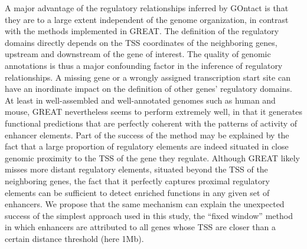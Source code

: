 A major advantage of the regulatory relationships inferred by GOntact is that they are to a large extent independent of the genome organization, in contrast with the methods implemented in GREAT. The definition of the regulatory domains directly depends on the TSS coordinates of the neighboring genes, upstream and downstream of the gene of interest. The quality of genomic annotations is thus a major confounding factor in the inference of regulatory relationships. A missing gene or a wrongly assigned transcription start site can have an inordinate impact on the definition of other genes’ regulatory domains. At least in well-assembled and well-annotated genomes such as human and mouse, GREAT nevertheless seems to perform extremely well, in that it generates functional predictions that are perfectly coherent with the patterns of activity of enhancer elements. Part of the success of the method may be explained by the fact that a large proportion of regulatory elements are indeed situated in close genomic proximity to the TSS of the gene they regulate. Although GREAT likely misses more distant regulatory elements, situated beyond the TSS of the neighboring genes, the fact that it perfectly captures proximal regulatory elements can be sufficient to detect enriched functions in any given set of enhancers. We propose that the same mechanism can explain the unexpected success of the simplest approach used in this study, the “fixed window” method in which enhancers are attributed to all genes whose TSS are closer than a certain distance threshold (here 1Mb). \\

